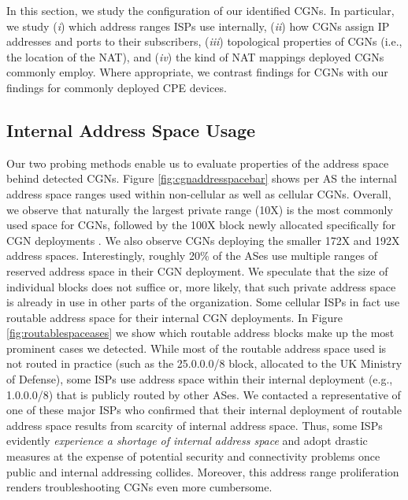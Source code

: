 \documentclass[10pt]{sig-alternate-05-2015}
\def\first{({\it i})\xspace}
\def\second{({\it ii})\xspace}
\def\third{({\it iii})\xspace}
\def\fourth{({\it iv})\xspace}
\begin{document}
In this section, we study the configuration of our identified CGNs. In 
particular, we study \first which address ranges ISPs use internally, \second 
how CGNs assign IP addresses and ports to their subscribers, \third topological 
properties of CGNs (i.e., the location of the NAT), and \fourth the kind of NAT 
mappings deployed CGNs commonly employ. Where appropriate, we contrast
findings for CGNs with our findings for commonly deployed CPE devices.





\subsection{Internal Address Space Usage}
\label{sec:privateaddressspaces}

Our two probing methods enable us to evaluate properties of the
address space behind detected CGNs. Figure \ref{fig:cgnaddresspacebar}
shows per AS the internal address space ranges used within non-cellular as
well as cellular CGNs. Overall, we observe that naturally the 
largest private range (10X) is the most commonly used space for CGNs, followed
by the 100X block newly allocated specifically for CGN 
deployments \cite{rfc6598}. We
also observe CGNs deploying the smaller 172X and 192X address
spaces. Interestingly, roughly 20\% of the ASes use multiple ranges of
reserved address space in their CGN deployment. We speculate that the
size of individual blocks does not suffice or, more likely, that such
private address space is already in use in other parts of the
organization. Some cellular ISPs in fact use routable address space
for their internal CGN deployments. In Figure
\ref{fig:routablespaceases} we show which routable address blocks make
up the most prominent cases we detected. While most of the routable
address space used is not routed in practice (such as the 25.0.0.0/8
block, allocated to the UK Ministry of Defense), some ISPs use address
space within their internal deployment (e.g., 1.0.0.0/8) that is
publicly routed by other ASes. We contacted a representative of one of
these major ISPs who confirmed that their internal deployment of routable 
address space results from scarcity of internal address space. Thus, some ISPs 
evidently \textit{experience a shortage of internal address space} and adopt 
drastic measures at the expense of potential security and connectivity 
problems once public and internal addressing collides. Moreover, this address 
range proliferation renders troubleshooting CGNs even more cumbersome.
\end{document}
